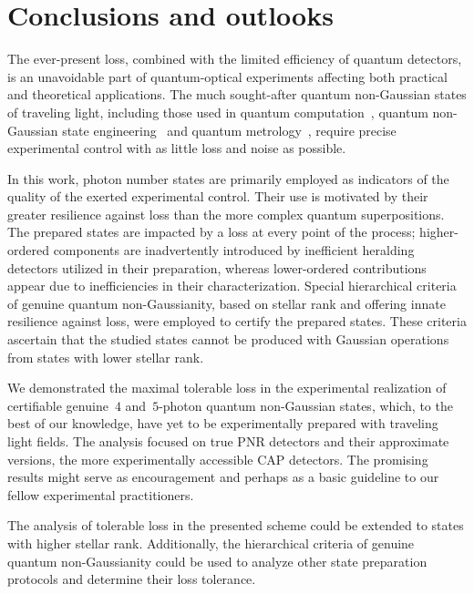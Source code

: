 \documentclass{optica-article}
\begin{document}
%

\FloatBarrier
\section{Conclusions and outlooks}

The ever-present loss, combined with the limited efficiency of quantum detectors, is an unavoidable part of quantum-optical experiments affecting both practical and theoretical applications. The much sought-after quantum non-Gaussian states of traveling light, including those used in quantum computation~\cite{lloyd1999,gottesman2001,menicucci2014,baragiola2019,bourassa2021,madsen2022,aghaeerad2025}, quantum non-Gaussian state engineering~\cite{filip2005,marek2009,marek2011,yukawa2013b,miyata2016,marek2018a,sakaguchi2023} and quantum metrology~\cite{oh2020,hanamura2023}, require precise experimental control with as little loss and noise as possible.

In this work, photon number states are primarily employed as indicators of the quality of the exerted experimental control. Their use is motivated by their greater resilience against loss than the more complex quantum superpositions. The prepared states are impacted by a loss at every point of the process; higher-ordered components are inadvertently introduced by inefficient heralding detectors utilized in their preparation, whereas lower-ordered contributions appear due to inefficiencies in their characterization. Special hierarchical criteria of genuine quantum non-Gaussianity, based on stellar rank and offering innate resilience against loss, were employed to certify the prepared states. These criteria ascertain that the studied states cannot be produced with Gaussian operations from states with lower stellar rank. 

We demonstrated the maximal tolerable loss in the experimental realization of certifiable genuine~$4$ and~$5$-photon quantum non-Gaussian states, which, to the best of our knowledge, have yet to be experimentally prepared with traveling light fields. The analysis focused on true PNR detectors and their approximate versions, the more experimentally accessible CAP detectors. The promising results might serve as encouragement and perhaps as a basic guideline to our fellow experimental practitioners.


The analysis of tolerable loss in the presented scheme could be extended to states with higher stellar rank. Additionally, the hierarchical criteria of genuine quantum non-Gaussianity could be used to analyze other state preparation protocols and determine their loss tolerance.
\end{document}
